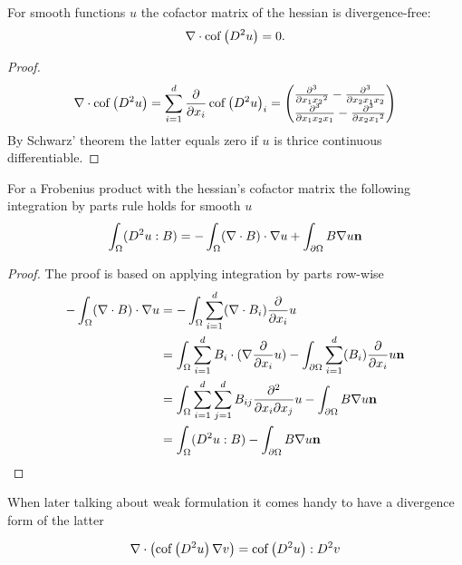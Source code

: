 \begin{lemma} \label{la: divergence free cof}
For smooth functions $u$ the cofactor matrix of the hessian is divergence-free:
\[
	\nabla \cdot \operatorname{cof} \left( D^2 u \right) = 0.
\] 
\end{lemma}
\begin{proof}
\begin{align*}
	\nabla \cdot \operatorname{cof} \left( D^2 u \right) = \sum_{i=1}^{d} \frac \partial {\partial  x_i}\operatorname{cof} \left( D^2 u \right)_i = 
	\begin{pmatrix}
		\frac {\partial^3} {\partial x_1 {x_2}^2 } -\frac {\partial^3} {\partial{x_2} x_1 {x_2}} \\
				\frac {\partial^3} {\partial {x_1}x_2 {x_1}} -\frac {\partial^3} {\partial x_2 {x_1}^2 }
	\end{pmatrix}
\end{align*}
By Schwarz' theorem the latter equals zero if $u$ is thrice continuous differentiable.
\end{proof}


\begin{lemma} \label{la: integration by parts Frobenius}
For a Frobenius product with the hessian's cofactor matrix  the following integration by parts rule holds for smooth $u$
\[
	\int_\Omega (D^2 u : B) = - \int_\Omega (\nabla \cdot B) \cdot \nabla u + \int_{\partial \Omega}  B \nabla u \bf n
\] 
\end{lemma}

\begin{proof}
The proof is based on applying integration by parts row-wise
\begin{align*}
- \int_\Omega (\nabla \cdot B) \cdot \nabla u &= 
- \int_\Omega \sum_{i = 1}^{d} (\nabla \cdot B_i) \frac \partial {\partial x_i} u \\
&=  \int_\Omega \sum_{i = 1}^{d} B_i \cdot  (\nabla \frac \partial {\partial x_i} u) - \int_{\partial \Omega} \sum_{i = 1}^{d} (B_i) \frac \partial {\partial x_i} u \mathbf{n} \\
&=  \int_\Omega \sum_{i = 1}^{d}\sum_{j= 1}^{d} B_{ij} \frac {\partial^2} {\partial x_i\partial x_j} u- \int_{\partial \Omega} B \nabla u \mathbf{n} \\
&=  \int_\Omega (D^2 u : B)- \int_{\partial \Omega} B \nabla u \mathbf{n} 
\end{align*}
\end{proof}

When later talking about weak formulation it comes handy to have a divergence form of the latter 
\begin{lemma} \label{la: An application of the divergernce product rule}
\[
		\nabla \cdot \left( \mycof {D^2 u } \nabla v \right) %
		= \mycof {D^2 u}: D^2 v
\] 
\end{lemma}


